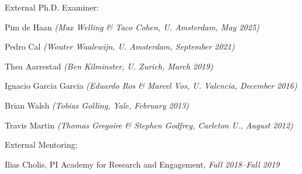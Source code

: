 \item External Ph.D. Examiner:
\bsbl 
\item Pim de Haan \textit{(Max Welling \& Taco Cohen, U. Amsterdam, May 2025)}
\item Pedro Cal \textit{(Wouter Waalewijn, U. Amsterdam, September 2021)}
\item Thea Aarrestad \textit{(Ben Kilminster, U. Zurich, March 2019)}
\item Ignacio Garcia Garcia \textit{(Eduardo Ros \& Marcel Vos, U. Valencia, December 2016)}
\item Brian Walsh \textit{(Tobias Golling, Yale, February 2013)}
\item Travis Martin \textit{(Thomas Gregoire \& Stephen Godfrey, Carleton U., August 2012)}
\el 
\item External Mentoring:
\bsbl 
\item Ilias Cholis, PI Academy for Research and Engagement, \emph{Fall 2018--Fall 2019}
\el 
\el
